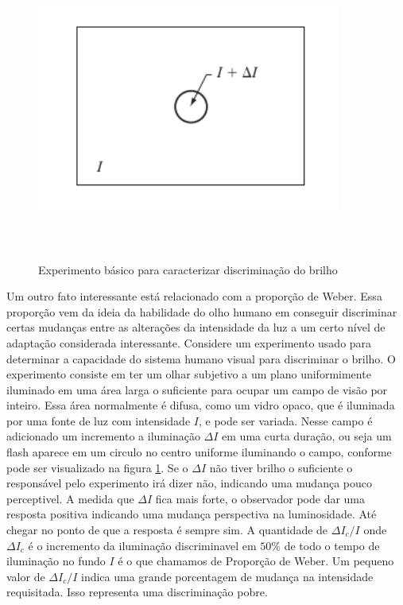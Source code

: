 \documentclass[12pt]{article}
\begin{document}
    \begin{figure}[h]
        \centering
        \includegraphics[width=10cm,height=10cm]{images/9.png}
        \caption{Experimento básico para caracterizar discriminação do brilho}
        \label{fig:Variação do I}
    \end{figure}

    Um outro fato interessante está relacionado com a proporção de Weber. Essa proporção vem da ideia
    da habilidade do olho humano em conseguir discriminar certas mudanças entre as alterações
    da intensidade da luz a um certo nível de adaptação considerada interessante.
    Considere um experimento usado para determinar a capacidade do sistema humano visual para discriminar
    o brilho. O experimento consiste em ter um olhar subjetivo a um plano uniformimente iluminado em uma área
    larga o suficiente para ocupar um campo de visão por inteiro. Essa área normalmente é difusa, como um vidro opaco, que
    é iluminada por uma fonte de luz com intensidade $I$, e pode ser variada. Nesse campo é adicionado um incremento a iluminação
    $\varDelta I$ em uma curta duração, ou seja um flash aparece em um circulo no centro uniforme iluminando o campo, conforme
    pode ser visualizado na figura \ref{fig:Variação do I}.
    Se o $\varDelta I$ não tiver brilho o suficiente o responsável pelo experimento irá dizer não, indicando uma mudança pouco
    perceptivel. A medida que $\varDelta I$ fica mais forte, o observador pode dar uma resposta positiva indicando uma mudança perspectiva na luminosidade. Até
    chegar no ponto de que a resposta é sempre sim. A quantidade de $\varDelta I_{c}/I$ onde $\varDelta I_{c}$ é o incremento da iluminação discriminavel em $50\%$ de todo o tempo
    de iluminação no fundo $I$ é o que chamamos de Proporção de Weber. Um pequeno valor de $\varDelta I_{c}/I$ indica uma grande porcentagem de mudança na intensidade requisitada.
    Isso representa uma discriminação pobre.
\end{document}
